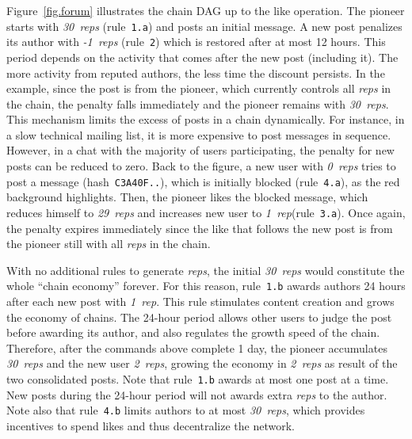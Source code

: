 \documentclass[10pt,journal,compsoc]{IEEEtran}
\newcommand{\reps}     {\emph{reps}\xspace}
\newcommand{\onerep}   {\emph{1~rep}\xspace}
\newcommand{\nreps}[1] {\emph{#1~reps\xspace}}
\begin{document}
Figure~\ref{fig.forum} illustrates the chain DAG up to the like operation.
The pioneer starts with \nreps{30} (rule~\texttt{1.a}) and posts an initial
message.
%
A new post penalizes its author with \nreps{-1} (rule~\texttt{2}) which is
restored after at most 12 hours.
This period depends on the activity that comes after the new post (including
it).
The more activity from reputed authors, the less time the discount persists.
In the example, since the post is from the pioneer, which currently controls
all \reps in the chain, the penalty falls immediately and the pioneer remains
with \nreps{30}.
This mechanism limits the excess of posts in a chain dynamically.
For instance, in a slow technical mailing list, it is more expensive to post
messages in sequence.
However, in a chat with the majority of users participating, the penalty for
new posts can be reduced to zero.
%
Back to the figure, a new user with \nreps{0} tries to post a message
(hash~\texttt{C3A40F..}), which is initially blocked (rule~\texttt{4.a}), as
the red background highlights.
Then, the pioneer likes the blocked message, which reduces himself to
\nreps{29} and increases new user to \onerep (rule~\texttt{3.a}).
Once again, the penalty expires immediately since the like that follows the new
post is from the pioneer still with all \reps in the chain.
%

%
With no additional rules to generate \reps, the initial \nreps{30} would
constitute the whole ``chain economy'' forever.
For this reason, rule~\texttt{1.b} awards authors 24 hours after each new post
with \onerep.
This rule stimulates content creation and grows the economy of chains.
The 24-hour period allows other users to judge the post before awarding its
author, and also regulates the growth speed of the chain.
Therefore, after the commands above complete 1 day, the pioneer accumulates
\nreps{30} and the new user \nreps{2}, growing the economy in \nreps{2} as
result of the two consolidated posts.
Note that rule~\texttt{1.b} awards at most one post at a time.
New posts during the 24-hour period will not awards extra \reps to the author.
Note also that rule~\texttt{4.b} limits authors to at most \nreps{30}, which
provides incentives to spend likes and thus decentralize the network.
\end{document}
